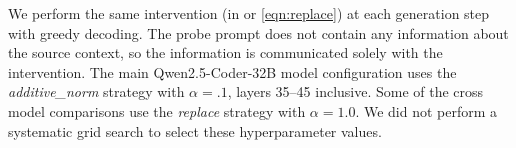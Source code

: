 We perform the same intervention (in  or \ref{eqn:replace}) at each generation step with greedy decoding. The probe prompt does not contain any information about the source context, so the information is communicated solely with the intervention. The main Qwen2.5-Coder-32B model configuration uses the \emph{additive\_norm} strategy with $\alpha=.1$, layers 35--45 inclusive. Some of the cross model comparisons use the \emph{replace} strategy with $\alpha=1.0$. We did not perform a systematic grid search to select these hyperparameter values.




